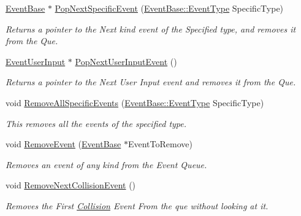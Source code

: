\begin{DoxyCompactItemize}
\hyperlink{classMezzanine_1_1EventBase}{EventBase} $\ast$ \hyperlink{classMezzanine_1_1EventManager_a1e142f7a2c658e0bbbd3e962ba24f8bb}{PopNextSpecificEvent} (\hyperlink{classMezzanine_1_1EventBase_ab85e31e97753b7e7ecb098f82526baef}{EventBase::EventType} SpecificType)
\begin{DoxyCompactList}\small\item\em Returns a pointer to the Next kind event of the Specified type, and removes it from the Que. \item\end{DoxyCompactList}\item 
\hyperlink{classMezzanine_1_1EventUserInput}{EventUserInput} $\ast$ \hyperlink{classMezzanine_1_1EventManager_a9a372e5988a549f61a1ff064b7239a8e}{PopNextUserInputEvent} ()
\begin{DoxyCompactList}\small\item\em Returns a pointer to the Next User Input event and removes it from the Que. \item\end{DoxyCompactList}\item 
void \hyperlink{classMezzanine_1_1EventManager_a209b69a260ea1a2351e005802d13803b}{RemoveAllSpecificEvents} (\hyperlink{classMezzanine_1_1EventBase_ab85e31e97753b7e7ecb098f82526baef}{EventBase::EventType} SpecificType)
\begin{DoxyCompactList}\small\item\em This removes all the events of the specified type. \item\end{DoxyCompactList}\item 
void \hyperlink{classMezzanine_1_1EventManager_ae3a90f7fdd0b75b4e4ff5e5d3ad3e332}{RemoveEvent} (\hyperlink{classMezzanine_1_1EventBase}{EventBase} $\ast$EventToRemove)
\begin{DoxyCompactList}\small\item\em Removes an event of any kind from the Event Queue. \item\end{DoxyCompactList}\item 
void \hyperlink{classMezzanine_1_1EventManager_ac35a0aa7e6e98a8024025f3babd40749}{RemoveNextCollisionEvent} ()
\begin{DoxyCompactList}\small\item\em Removes the First \hyperlink{classMezzanine_1_1Collision}{Collision} Event From the que without looking at it. \item\end{DoxyCompactList}\item 

\end{DoxyCompactItemize}
